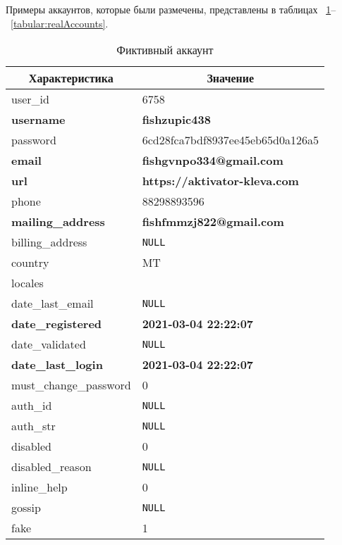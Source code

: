 \newpage
\setcounter{table}{0}
\setcounter{figure}{0}
\label{sec:AppendixA}


Примеры аккаунтов, которые были размечены, представлены в таблицах ~\ref{tabular:fakeAccounts}--~\ref{tabular:realAccounts}.

\begin{table}[h]
    \caption{Фиктивный аккаунт}
    \vspace{1em}
    \label{tabular:fakeAccounts}
    \fontsize{12}
    \selectfont
    \begin{tabular}{|l|l|}
    \hline
    \multicolumn{1}{|c|}{\textbf{Характеристика}} & 
    \multicolumn{1}{c|}{\textbf{Значение}}\\ \hline
        user\_id & 6758 \\ 
        \textbf{username} & \textbf{fishzupic438} \\ 
        password & 6cd28fca7bdf8937ee45eb65d0a126a5 \\ 
        \textbf{email} & \textbf{fishgvnpo334@gmail.com} \\ 
        \textbf{url} & \textbf{https://aktivator-kleva.com} \\ 
        phone & 88298893596 \\ 
        \textbf{mailing\_address} & \textbf{fishfmmzj822@gmail.com} \\ 
        billing\_address & \texttt{NULL} \\ 
        country & MT \\ 
        locales &  \\ 
        date\_last\_email & \texttt{NULL} \\ 
        \textbf{date\_registered} & \textbf{2021-03-04 22:22:07} \\ 
        date\_validated & \texttt{NULL} \\ 
        \textbf{date\_last\_login} & \textbf{2021-03-04 22:22:07} \\ 
        must\_change\_password & 0 \\ 
        auth\_id & \texttt{NULL} \\ 
        auth\_str & \texttt{NULL} \\ 
        disabled & 0 \\ 
        disabled\_reason & \texttt{NULL} \\ 
        inline\_help & 0 \\ 
        gossip & \texttt{NULL} \\ 
        fake & 1 \\ 
        \hline
    \end{tabular}
\end{table}

